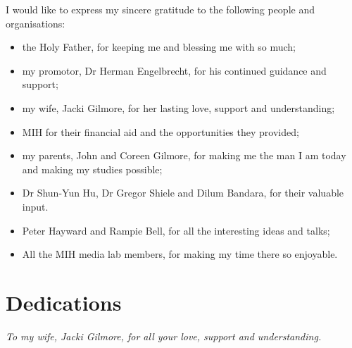 I would like to express my sincere gratitude to the following people and organisations:
\begin{itemize}
  \item the Holy Father, for keeping me and blessing me with so much;
  \item my promotor, Dr Herman Engelbrecht, for his continued guidance and support;
  \item my wife, Jacki Gilmore, for her lasting love, support and understanding;
  \item MIH for their financial aid and the opportunities they provided;
  \item my parents, John and Coreen Gilmore, for making me the man I am today and making
  my studies possible;
  \item Dr Shun-Yun Hu, Dr Gregor Shiele and Dilum Bandara, for their valuable input.
  \item Peter Hayward and Rampie Bell, for all the interesting ideas and talks;
  \item All the MIH media lab members, for making my time there so enjoyable.
\end{itemize}


\chapter{Dedications}%
 \vfill
 \begin{center}\itshape
    To my wife, Jacki Gilmore, for all your love, support and understanding.
 \end{center}
 \vfill
 \clearpage

\endinput
